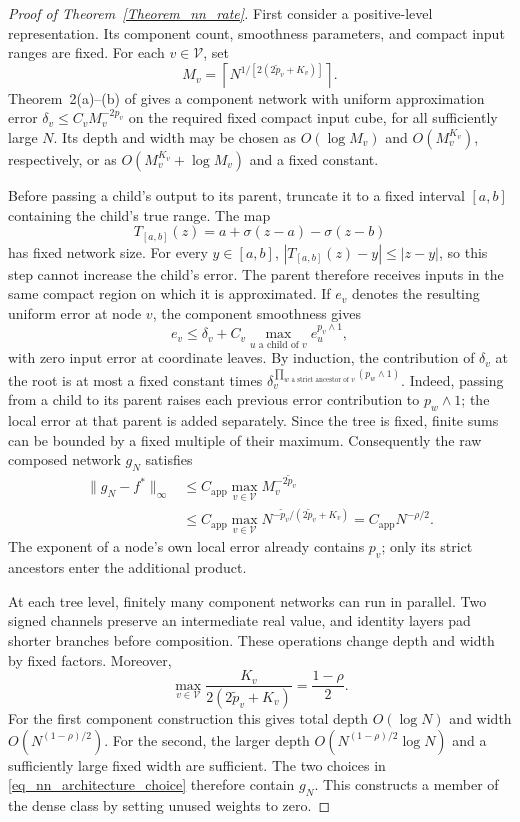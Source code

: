 \documentclass[twoside,11pt]{article}
\newenvironment{revision}{\color{revisionred}}{}
\begin{document}
\begin{revision}
\begin{proof}[Proof of Theorem~\ref{Theorem_nn_rate}]
First consider a positive-level representation. Its component
count, smoothness parameters, and compact input ranges are fixed.
For each $v\in\mathcal V$, set
\[
M_v=\left\lceil
N^{1/[2(2\widetilde p_v+K_v)]}
\right\rceil.
\]
Theorem~2(a)--(b) of \citet{kohler2019rate} gives a component
network with uniform approximation error
$\delta_v\leq C_vM_v^{-2p_v}$ on the required fixed compact
input cube, for all sufficiently large $N$. Its depth and width
may be chosen as $O(\log M_v)$ and $O(M_v^{K_v})$, respectively,
or as $O(M_v^{K_v}+\log M_v)$ and a fixed constant.

Before passing a child's output to its parent, truncate it to
a fixed interval $[a,b]$ containing the child's true range.
The map
\[
T_{[a,b]}(z)=a+\sigma(z-a)-\sigma(z-b)
\]
has fixed network size. For every $y\in[a,b]$,
$|T_{[a,b]}(z)-y|\leq|z-y|$, so this step cannot increase the
child's error. The parent therefore receives inputs in the same
compact region on which it is approximated. If $e_v$ denotes
the resulting uniform error at node $v$, the component smoothness
gives
\[
e_v\leq\delta_v+
C_v\max_{u\text{ a child of }v}e_u^{p_v\wedge1},
\]
with zero input error at coordinate leaves. By induction,
the contribution of $\delta_v$ at the root is at most a fixed
constant times
\(\delta_v^{\prod_{w\text{ a strict ancestor of }v}(p_w\wedge1)}\).
Indeed, passing from a child to its parent raises each previous
error contribution to $p_w\wedge1$; the local error at that
parent is added separately. Since the tree is fixed, finite
sums can be bounded by a fixed multiple of their maximum.
Consequently the raw composed network $g_N$ satisfies
\begin{align*}
\|g_N-f^*\|_\infty
&\leq C_{\mathrm{app}}
       \max_{v\in\mathcal V}M_v^{-2\widetilde p_v}\\
&\leq C_{\mathrm{app}}
       \max_{v\in\mathcal V}
       N^{-\widetilde p_v/(2\widetilde p_v+K_v)}
=C_{\mathrm{app}}N^{-\rho/2}.
\end{align*}
The exponent of a node's own local error already contains $p_v$;
only its strict ancestors enter the additional product.

At each tree level, finitely many component networks can run
in parallel. Two signed channels preserve an intermediate real
value, and identity layers pad shorter branches before composition.
These operations change depth and width by fixed factors.
Moreover,
\[
\max_{v\in\mathcal V}
\frac{K_v}{2(2\widetilde p_v+K_v)}
=\frac{1-\rho}{2}.
\]
For the first component construction this gives total depth
$O(\log N)$ and width $O(N^{(1-\rho)/2})$.
For the second, the larger depth
$O(N^{(1-\rho)/2}\log N)$ and a sufficiently large fixed width
are sufficient. The two choices in
\eqref{eq_nn_architecture_choice} therefore contain $g_N$.
This constructs a member of the dense class by setting unused
weights to zero.


\end{proof}
\end{revision}
\end{document}

